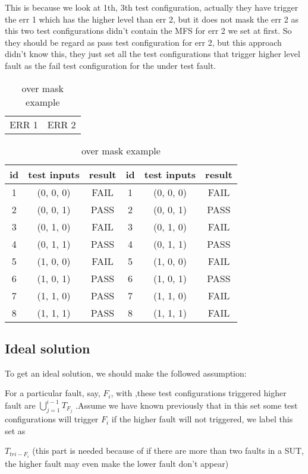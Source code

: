 \documentclass{sig-alternate}
\begin{document}
This is because we look at 1th, 3th test configuration, actually they have trigger the err 1 which has the higher level than err 2, but it does not mask the err 2 as this two test configurations didn't contain the MFS for err 2 we set at first. So they should be regard as pass test configuration for err 2, but this approach didn't know this, they just set all the test configurations that trigger higher level fault as the fail test configuration for the under test fault.

\begin{table}
\centering
\caption{over mask example}
\label{another_idea_masking}
\begin{tabular}{p{}|p{}} \hline
   ERR 1 & ERR 2
\end{tabular}

\begin{tabular}{c|c|c|c|c|c} \hline
id &test inputs & result & id&test inputs & result\\ \hline
1 &(0, 0, 0) &  FAIL &1&(0, 0, 0) &  FAIL\\ \hline
2 &(0, 0, 1) &  PASS &2&(0, 0, 1) &  PASS\\ \hline
3 &(0, 1, 0) &  FAIL &3&(0, 1, 0) &  FAIL\\ \hline
4 &(0, 1, 1) &  PASS &4&(0, 1, 1) &  PASS\\ \hline
5 &(1, 0, 0) &  FAIL &5&(1, 0, 0) &  FAIL\\ \hline
6 &(1, 0, 1) &  PASS &6&(1, 0, 1) &  PASS\\ \hline
7 &(1, 1, 0) &  PASS &7&(1, 1, 0) &  FAIL\\ \hline
8 &(1, 1, 1) &  PASS &8&(1, 1, 1) &  FAIL\\ \hline
\hline\end{tabular}
\end{table}

\subsection{Ideal solution}
To get an ideal solution, we should make the followed assumption:

For a particular fault, say, $F_{i}$, with ,these test configurations triggered higher fault are  $ \bigcup_{j = 1}^{i-1}T_{F_{j}}$ .Assume we have known previously that in this set some test configurations will trigger $F_{i}$ if the higher fault will not triggered, we label this set as

$ T_{tri-F_{i}}$ (this part is needed because of if there are more than two faults in a SUT, the higher fault may even make the lower fault don't appear)
\end{document}
